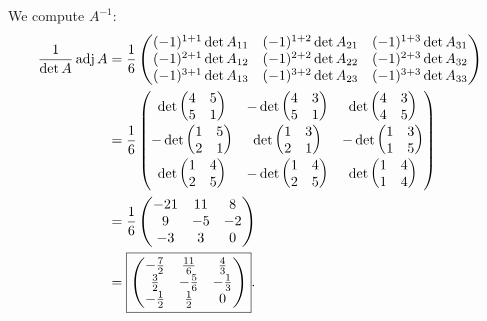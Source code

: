 \documentclass[main.tex]{subfiles}
\begin{document}
\begin{soln}
    We compute $A^{-1}$:
    \begin{align*}
        \frac{1}{\det A}\operatorname{adj} A &= \frac{1}{6}\begin{pmatrix}
            (-1)^{1 + 1}\det A_{11} & (-1)^{1 + 2}\det A_{21} & (-1)^{1 + 3}\det A_{31} \\
            (-1)^{2 + 1}\det A_{12} & (-1)^{2 + 2}\det A_{22} & (-1)^{2 + 3}\det A_{32} \\
            (-1)^{3 + 1}\det A_{13} & (-1)^{3 + 2}\det A_{23} & (-1)^{3 + 3}\det A_{33}
        \end{pmatrix} \\
        &= \frac{1}{6}\begin{pmatrix}
            \det \begin{pmatrix} 4 & 5 \\ 5 & 1 \end{pmatrix} & -\det \begin{pmatrix} 4 & 3 \\ 5 & 1 \end{pmatrix} & \det \begin{pmatrix} 4 & 3 \\ 4 & 5 \end{pmatrix} \\
            -\det \begin{pmatrix} 1 & 5 \\ 2 & 1 \end{pmatrix} & \det \begin{pmatrix} 1 & 3 \\ 2 & 1 \end{pmatrix} & -\det \begin{pmatrix} 1 & 3 \\ 1 & 5 \end{pmatrix} \\
            \det \begin{pmatrix} 1 & 4 \\ 2 & 5 \end{pmatrix} & -\det \begin{pmatrix} 1 & 4 \\ 2 & 5 \end{pmatrix} & \det \begin{pmatrix} 1 & 4 \\ 1 & 4 \end{pmatrix}
        \end{pmatrix} \\
        &= \frac{1}{6}\begin{pmatrix}
            -21 & 11 & 8 \\
            9 & -5 & -2 \\
            -3 & 3 & 0
        \end{pmatrix} \\
        &= \boxed{\begin{pmatrix}
            -\frac{7}{2} & \frac{11}{6} & \frac{4}{3} \\
            \frac{3}{2} & -\frac{5}{6} & -\frac{1}{3} \\
            -\frac{1}{2} & \frac{1}{2} & 0
        \end{pmatrix}}.
    \end{align*}
\end{soln}
\end{document}
